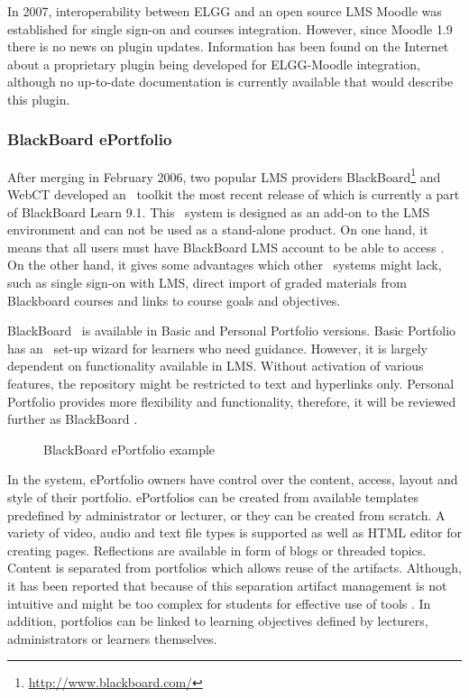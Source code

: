 In 2007, interoperability between ELGG and an open source LMS Moodle was
established for single sign-on and courses integration. However, since Moodle
1.9 there is no news on plugin updates. Information has been found on the
Internet about a proprietary plugin being developed for ELGG-Moodle integration,
although no up-to-date documentation is currently available that would describe
this plugin.

\subsubsection{BlackBoard ePortfolio}
After merging in February 2006, two popular LMS providers
BlackBoard\footnote{\url{http://www.blackboard.com/}} and WebCT developed an
\ep~toolkit the most recent release of which is currently a part of BlackBoard
Learn 9.1. This \ep~system is designed as an add-on to the LMS environment and
can not be used as a stand-alone product. On one hand, it means that all users
must have BlackBoard LMS account to be able to access \ep. On the other hand, it
gives some advantages which other \ep~systems might lack, such as single sign-on
with LMS, direct import of graded materials from Blackboard courses and links to
course goals and objectives.

BlackBoard \ep~is available in Basic and Personal Portfolio versions. Basic
Portfolio has an \ep~set-up wizard for learners who need guidance. However, it
is largely dependent on functionality available in LMS. Without activation of
various features, the repository might be restricted to text and hyperlinks
only. Personal Portfolio provides more flexibility and functionality, therefore,
it will be reviewed further as BlackBoard \ep.

\begin{figure}[htb]
\centering 
\setlength\fboxsep{0pt}
\setlength\fboxrule{0.5pt}
\fbox{\texttt{[image: CH4-F6-BB]}}
\caption[BlackBoard ePortfolio example]{BlackBoard ePortfolio example
\citep{UniversityofTorontoScarborough2010}}
\label{fig:bbep}
\end{figure}

In the system, ePortfolio owners have control over the content, access, layout
and style of their portfolio. ePortfolios can be created from available
templates predefined by administrator or lecturer, or they can be created from
scratch. A variety of video, audio and text file types is supported as well as
HTML editor for creating pages. Reflections are available in form of blogs or
threaded topics. Content is separated from portfolios which allows reuse of the
artifacts. Although, it has been reported that because of this separation
artifact management is not intuitive and might be too complex for students for
effective use of tools \citep{Clark2009}. In addition, portfolios can be linked
to learning objectives defined by lecturers, administrators or learners themselves.

